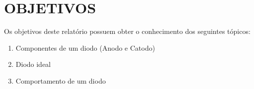 \chapter{OBJETIVOS}

Os objetivos deste relatório possuem obter o conhecimento dos seguintes tópicos:

\begin{enumerate}
    \item Componentes de um diodo (Anodo e Catodo)
    \item Diodo ideal
    \item Comportamento de um diodo
\end{enumerate}